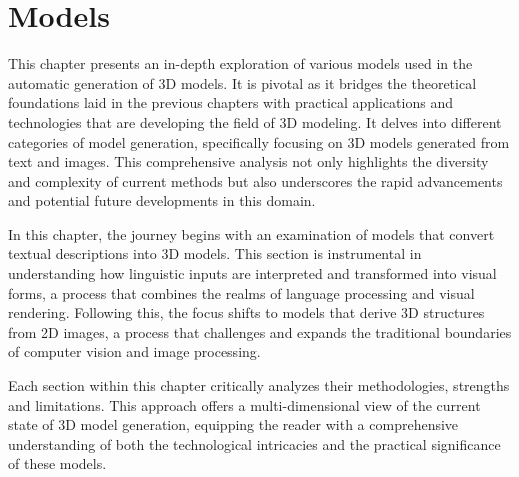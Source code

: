 \chapter{Models}\label{ch:models}

This chapter presents an in-depth exploration of various models used in the automatic generation of 3D models. It is pivotal as it bridges the theoretical foundations laid in the previous chapters with practical applications and technologies that are developing the field of 3D modeling. It delves into different categories of model generation, specifically focusing on 3D models generated from text and images. This comprehensive analysis not only highlights the diversity and complexity of current methods but also underscores the rapid advancements and potential future developments in this domain.

In this chapter, the journey begins with an examination of models that convert textual descriptions into 3D models. This section is instrumental in understanding how linguistic inputs are interpreted and transformed into visual forms, a process that combines the realms of language processing and visual rendering. Following this, the focus shifts to models that derive 3D structures from 2D images, a process that challenges and expands the traditional boundaries of computer vision and image processing.

Each section within this chapter critically analyzes their methodologies, strengths and limitations. This approach offers a multi-dimensional view of the current state of 3D model generation, equipping the reader with a comprehensive understanding of both the technological intricacies and the practical significance of these models.



%
